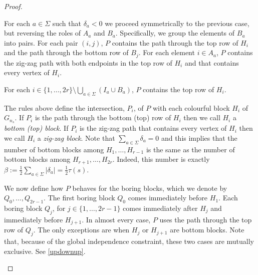 \documentclass{patmorin}
\begin{document}
\begin{proof}
\begin{compactenum}
        \item For each $a\in\Sigma$ such that $\delta_a<0$ we proceed symmetrically to the previous case, but reversing the roles of $A_a$ and $B_a$.  Specifically, we group the elements of $B_a$ into pairs.  For each pair $(i,j)$, $P$ contains the path through the top row of $H_i$ and the path through the bottom row of $B_j$.  For each element $i\in A_a$, $P$ contains the zig-zag path with both endpoints in the top row of $H_i$ and that contains every vertex of $H_i$.

        \item For each $i\in\{1,\ldots,2r\}\setminus\bigcup_{a\in\Sigma}(I_a\cup B_a)$, $P$ contains the top row of $H_i$.
    \end{compactenum}
    The rules above define the intersection, $P_i$, of $P$ with each colourful block $H_i$ of $G_{n_s}$.  If $P_i$ is the path through the bottom (top) row of $H_i$ then we call $H_i$ a \emph{bottom (top) block}.  If $P_i$ is the zig-zag path that contains every vertex of $H_i$ then we call $H_i$ a \emph{zig-zag block}.  Note that $\sum_{a\in\Sigma} \delta_a = 0$ and this implies that the number of bottom blocks among $H_1,\ldots,H_{r-1}$ is the same as the number of bottom blocks among $H_{r+1},\ldots,H_{2r}$.  Indeed, this number is exactly $\beta:=\tfrac{1}{2}\sum_{a\in\Sigma} |\delta_a|=\tfrac{1}{2}\tau(s)$.

    We now define how $P$ behaves for the boring blocks, which we denote by  $Q_0,\ldots,Q_{2r-1}$. The first boring block $Q_0$ comes immediately before $H_1$. Each boring block $Q_j$, for $j\in\{1,\ldots,2r-1\}$ comes immediately after $H_j$ and immediately before $H_{j+1}$.  In almost every case, $P$ uses the path through the top row of $Q_j$.  The only exceptions are when $H_j$ or $H_{j+1}$ are bottom blocks. Note that, because of the global independence constraint, these two cases are mutually exclusive. See \cref{updownup}.

    \begin{figure}
    \end{figure}


\end{proof}
\end{document}

